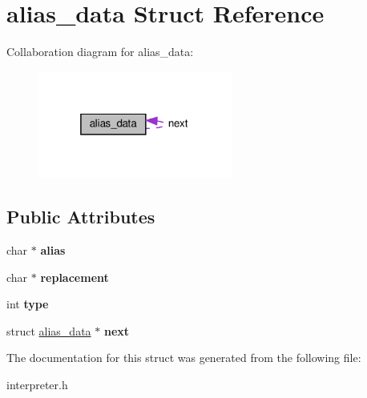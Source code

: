 \hypertarget{structalias__data}{}\section{alias\+\_\+data Struct Reference}
\label{structalias__data}


Collaboration diagram for alias\+\_\+data\+:
\nopagebreak
\begin{figure}[H]
\begin{center}
\leavevmode
\includegraphics[width=181pt]{structalias__data__coll__graph}
\end{center}
\end{figure}
\subsection*{Public Attributes}
\begin{DoxyCompactItemize}
\item 
\mbox{\label{structalias__data_afa3c77bfbb429b96d0b0ca785c15b59e}} 
char $\ast$ {\bfseries alias}
\item 
\mbox{\label{structalias__data_a1e8e865209e68e26e8d2a1e4601db7cb}} 
char $\ast$ {\bfseries replacement}
\item 
\mbox{\label{structalias__data_a1253a42c6d693ae0e95fe3634806e2b8}} 
int {\bfseries type}
\item 
\mbox{\label{structalias__data_aa14a570620f2eccfc657449921c00547}} 
struct \hyperlink{structalias__data}{alias\+\_\+data} $\ast$ {\bfseries next}
\end{DoxyCompactItemize}


The documentation for this struct was generated from the following file\+:\begin{DoxyCompactItemize}
\item 
interpreter.\+h\end{DoxyCompactItemize}
